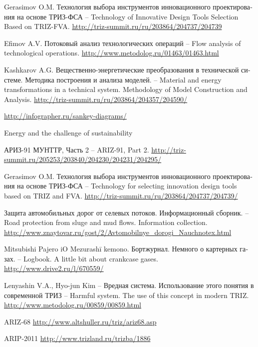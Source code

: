 \documentclass[a4paper,11pt]{article}
\begin{document}
\begin{thebibliography}{xxx}
 Gerasimov O.M. \foreignlanguage{russian}{Технология выбора
  инструментов инновационного проектирования на основе ТРИЗ-ФСА} -- Technology
  of Innovative Design Tools Selection Based on TRIZ-FVA.
  \url{http://triz-summit.ru/ru/203864/204737/204739}
  
 Efimov A.V. \foreignlanguage{russian}{Потоковый анализ
  технологических операций} -- Flow analysis of technological operations.
  \url{http://www.metodolog.ru/01463/01463.html}
  
 Kashkarov A.G.
  \foreignlanguage{russian}{Вещественно-энергетические преобразования в
    технической системе. Методика построения и анализа моделей.} -- Material
  and energy transformations in a technical system. Methodology of Model
  Construction and Analysis.
  \url{http://triz-summit.ru/ru/203864/204357/204590/}

 \url{http://infographer.ru/sankey-diagrams/}

 Energy and the challenge of sustainability 

 \foreignlanguage{russian}{АРИЗ-91 МУНТТР, Часть 2} -- ARIZ-91,
  Part 2.  \url{http://triz-summit.ru/205253/203840/204230/204231/204295/}

 Gerasimov O.M. \foreignlanguage{russian}{Технология выбора
  инструментов инновационного проектирования на основе ТРИЗ-ФСА} -- Technology
  for selecting innovation design tools based on TRIZ and FVA.
  \url{http://triz-summit.ru/ru/203864/204737/204739/}
  
 \foreignlanguage{russian}{Защита автомобильных дорог от селевых
  потоков.  Информационный сборник.} -- Road protection from sluge and mud
  flows. Information collection.
  \url{http://www.znaytovar.ru/gost/2/Avtomobilnye_dorogi_Nauchnotex.html}

 Mitsubishi Pajero iO Mezurashī kemono.
  \foreignlanguage{russian}{Бортжурнал. Немного о картерных газах.} --
  Logbook.  A little bit about crankcase gases.
  \url{http://www.drive2.ru/l/670559/}

 Lenyashin V.A., Hyo-jun Kim -- \foreignlanguage{russian}{Вредная
  система.  Использование этого понятия в современной ТРИЗ} -- Harmful system.
  The use of this concept in modern TRIZ.
  \url{http://www.metodolog.ru/00859/00859.html}
  
 ARIZ-68 \url{http://www.altshuller.ru/triz/ariz68.asp}

 ARIP-2011 \url{http://www.trizland.ru/trizba/1886}
\end{thebibliography}
\end{document}
